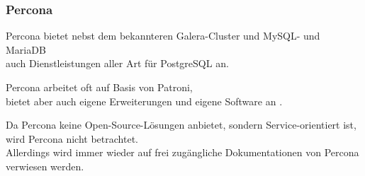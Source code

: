 
\begin{flushleft}
    \subsubsection{Percona}
    Percona bietet nebst dem bekannteren Galera-Cluster und \Gls{MySQL}- und \Gls{MariaDB}\\
    auch Dienstleistungen  \cite{WEM9KYAX} aller Art für PostgreSQL an.
\end{flushleft}
\begin{flushleft}
    Percona arbeitet oft auf Basis von Patroni,\\
    bietet aber auch eigene Erweiterungen und eigene Software an \cite{66AS3BU9}.
\end{flushleft}
\begin{flushleft}
    Da Percona keine Open-Source-Lösungen anbietet, sondern Service-orientiert ist,\\
    wird Percona nicht betrachtet.\\
    Allerdings wird immer wieder auf frei zugängliche Dokumentationen von Percona verwiesen werden.
\end{flushleft}